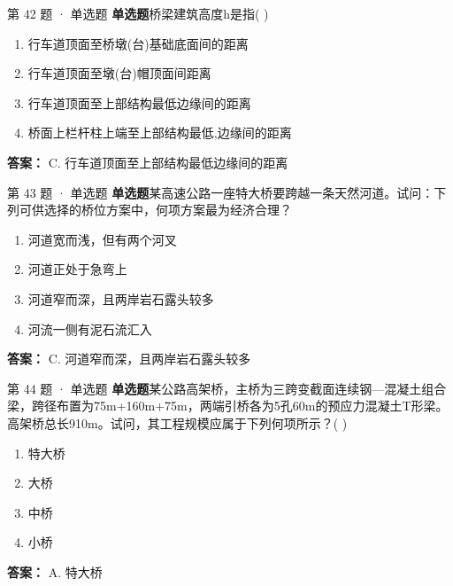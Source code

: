 \documentclass[UTF8,zihao=-4,openany]{ctexbook}
\newenvironment{choices}{\begin{enumerate}[label=\Alph*.,leftmargin=9mm,labelsep=3mm,itemsep=2pt,topsep=4pt]}{\end{enumerate}}
\newcommand{\qtype}[1]{\textcolor{brand}{\sffamily\bfseries #1}}
\begin{document}
\begin{questionbox}{第 42 题 · 单选题}
\qtype{单选题}\quad 桥梁建筑高度h是指( )
\begin{choices}
\item 行车道顶面至桥墩(台)基础底面间的距离
\item 行车道顶面至墩(台)帽顶面间距离
\item 行车道顶面至上部结构最低边缘间的距离
\item 桥面上栏杆柱上端至上部结构最低,边缘间的距离
\end{choices}
\begin{answerbox}
\textbf{答案：} C. 行车道顶面至上部结构最低边缘间的距离
\end{answerbox}
\end{questionbox}

\begin{questionbox}{第 43 题 · 单选题}
\qtype{单选题}\quad 某高速公路一座特大桥要跨越一条天然河道。试问：下列可供选择的桥位方案中，何项方案最为经济合理？
\begin{choices}
\item 河道宽而浅，但有两个河叉
\item 河道正处于急弯上
\item 河道窄而深，且两岸岩石露头较多
\item 河流一侧有泥石流汇入
\end{choices}
\begin{answerbox}
\textbf{答案：} C. 河道窄而深，且两岸岩石露头较多
\end{answerbox}
\end{questionbox}

\begin{questionbox}{第 44 题 · 单选题}
\qtype{单选题}\quad 某公路高架桥，主桥为三跨变截面连续钢—混凝土组合梁，跨径布置为75m+160m+75m，两端引桥各为5孔60m的预应力混凝土T形梁。高架桥总长910m。试问，其工程规模应属于下列何项所示？( )
\begin{choices}
\item 特大桥
\item 大桥
\item 中桥
\item 小桥
\end{choices}
\begin{answerbox}
\textbf{答案：} A. 特大桥
\end{answerbox}
\end{questionbox}
\end{document}
